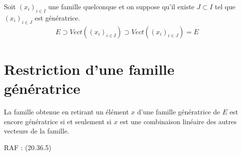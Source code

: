 \documentclass[../main.tex]{subfiles}
\begin{document}
\noindent Soit $(x_i)_{i\in I}$ une famille quelconque et on suppose qu'il existe $J \subset I$ tel que $(x_i)_{i\in J}$ est génératrice. \\
\begin{align*}
    E \supset Vect((x_i)_{i\in I}) \supset Vect((x_i)_{i\in J}) = E
\end{align*}

\section{Restriction d'une famille génératrice}
\begin{tcolorbox}[title=Propostion 20.69, title filled=false, colframe=lightblue, colback=lightblue!10!white]
    La famille obtenue en retirant un élément $x$ d'une famille génératrice de $E$ est encore génératrice si et seulement si $x$ est une combinaison linéaire des autres vecteurs de la famille. 
\end{tcolorbox}

\noindent RAF : (20.36.5)
\end{document}
